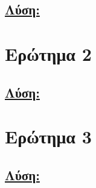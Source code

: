 \documentclass[a4paper,12pt,titlepage]{article}
\begin{document}
\subsection*{\underline{Λύση:}}


\section{Ερώτημα 2}


\subsection*{\underline{Λύση:}}


\section{Ερώτημα 3}


\subsection*{\underline{Λύση:}}
\end{document}
